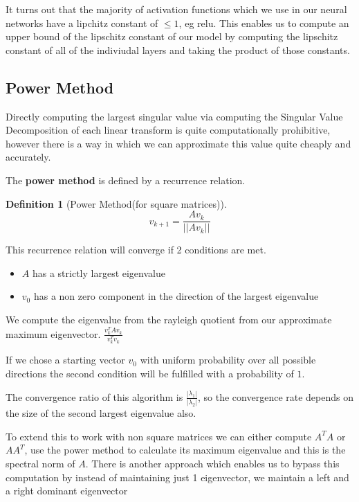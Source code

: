 \documentclass[12pt, a4paper]{report}
\theoremstyle{definition}
\newtheorem{definition}{Definition}[section]
\begin{document}
It turns out that the majority of activation functions which we use in our neural networks have a lipchitz constant of $\leq 1$, eg relu. This enables us to compute an upper bound of the lipschitz constant of our model by computing the lipschitz constant of all of the indiviudal layers and taking the product of those constants.



\subsection{Power Method}

Directly computing the largest singular value via computing the Singular Value Decomposition of each linear transform is quite computationally prohibitive, however there is a way in which we can approximate this value quite cheaply and accurately.

The \textbf{power method} is defined by a recurrence relation.

\begin{definition}[Power Method(for square matrices)]
    $$v_{k+1} = \frac{Av_k}{||Av_k||} $$
\end{definition}

This recurrence relation will converge if 2 conditions are met.

\begin{itemize}
    \item $A$ has a strictly largest eigenvalue
    \item $v_0$ has a non zero component in the direction of the largest eigenvalue
\end{itemize}

We compute the eigenvalue from the rayleigh quotient from our approximate maximum eigenvector. $\frac{v_k^T A v_k}{v_k ^ T v_k}$

If we chose a starting vector $v_0$ with uniform probability over all possible directions the second condition will be fulfilled with a probability of $1$.

The convergence ratio of this algorithm is $\frac{|\lambda_1|}{|\lambda_2|}$, so the convergence rate depends on the size of the second largest eigenvalue also.


To extend this to work with non square matrices we can either compute $A^TA$ or $AA^T$, use the power method to calculate its maximum eigenvalue and this is the spectral norm of $A$.
There is another approach which enables us to bypass this computation by instead of maintaining just 1 eigenvector, we maintain a left and a right dominant eigenvector
\end{document}
